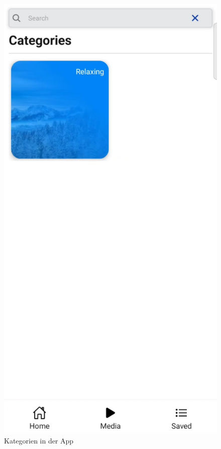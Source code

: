 \begin{figure}[H]
\begin{minipage}{0.5\textwidth}
    \end{minipage}
    \begin{minipage}{0.5\textwidth}
        \centering
        \includegraphics[height=2\textwidth]{./pics/Kategorien.jpg}
        \caption{Kategorien in der App}
    \end{minipage}
\end{figure}

